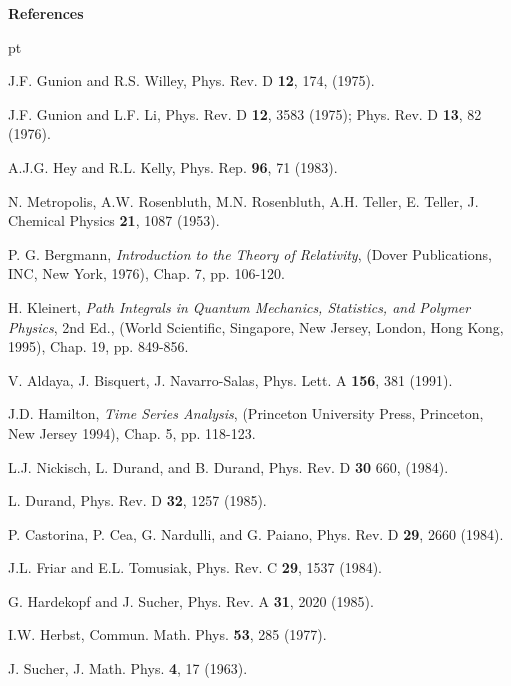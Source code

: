 \documentclass[epsf]{article}
\begin{document}
\newpage
\pagestyle{empty}
\centerline{\bf References}
 pt
\begin{thebibliography}{99}

   J.F. Gunion and R.S. Willey,
{Phys. Rev. D} {\bf 12}, 174, (1975).

   J.F. Gunion and L.F. Li, 
{Phys. Rev. D} {\bf 12}, 3583 (1975);
{Phys. Rev. D} {\bf 13}, 82 (1976).

   A.J.G. Hey and R.L. Kelly,
{Phys. Rep.} {\bf 96}, 71 (1983).

   N. Metropolis, A.W. Rosenbluth, M.N. Rosenbluth, A.H. Teller,
E. Teller,
{J. Chemical Physics} {\bf 21}, 1087 (1953).

   P. G. Bergmann, {\it Introduction to the Theory of Relativity}, 
(Dover Publications, INC, New York, 1976), Chap. 7, pp. 106-120.

   H. Kleinert, {\it Path Integrals in Quantum Mechanics, Statistics,
                     and Polymer Phys\-ics}, 2nd Ed., 
(World Scientific, Singapore, New Jersey, London, Hong Kong, 1995), 
Chap. 19, pp. 849-856.

   V. Aldaya, J. Bisquert, J. Navarro-Salas, 
{Phys. Lett. A} {\bf 156}, 381 (1991).

   J.D. Hamilton, {\it Time Series Analysis}, 
(Princeton University Press, Princeton, New Jersey 1994), 
Chap. 5, pp. 118-123.

L.J. Nickisch, L. Durand, and
B. Durand, {Phys. Rev. D} {\bf 30} 660, (1984).

L. Durand, {Phys. Rev. D} {\bf 32}, 1257 (1985).

P. Castorina, P. Cea, G. Nardulli, and G. Paiano,
{Phys. Rev. D} {\bf 29}, 2660 (1984).

J.L. Friar and E.L. Tomusiak,
{Phys. Rev. C} {\bf 29}, 1537 (1984).

G. Hardekopf and J. Sucher, {Phys. Rev. A} {\bf 31}, 2020 (1985).

I.W. Herbst, {Commun. Math. Phys.} {\bf 53}, 285 (1977).

J. Sucher, {J. Math. Phys.} {\bf 4}, 17 (1963).
\end{thebibliography}

\newpage
\pagestyle{empty}
\end{document}
